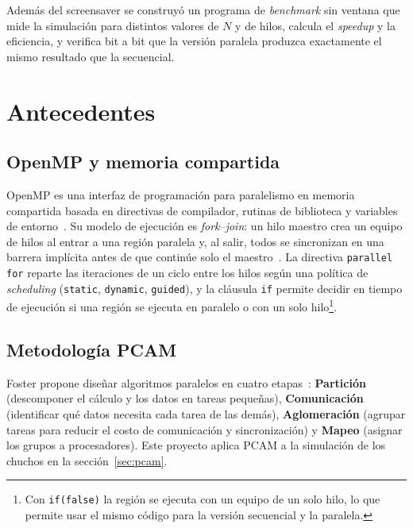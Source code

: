 \documentclass[11pt,letterpaper]{article}
\newcommand{\codigo}[1]{\texttt{#1}}
\begin{document}
Además del screensaver se construyó un programa de \emph{benchmark} sin ventana
que mide la simulación para distintos valores de $N$ y de hilos, calcula el
\emph{speedup} y la eficiencia, y verifica bit a bit que la versión paralela
produzca exactamente el mismo resultado que la secuencial.

\section{Antecedentes}

\subsection{OpenMP y memoria compartida}

OpenMP es una interfaz de programación para paralelismo en memoria compartida
basada en directivas de compilador, rutinas de biblioteca y variables de
entorno~\cite{openmp52}. Su modelo de ejecución es \emph{fork--join}: un hilo
maestro crea un equipo de hilos al entrar a una región paralela y, al salir,
todos se sincronizan en una barrera implícita antes de que continúe solo el
maestro~\cite{chapman2008}. La directiva \codigo{parallel for} reparte las
iteraciones de un ciclo entre los hilos según una política de
\emph{scheduling} (\codigo{static}, \codigo{dynamic}, \codigo{guided}), y la
cláusula \codigo{if} permite decidir en tiempo de ejecución si una región se
ejecuta en paralelo o con un solo hilo\footnote{Con \codigo{if(false)} la
región se ejecuta con un equipo de un solo hilo, lo que permite usar el mismo
código para la versión secuencial y la paralela.}.

\subsection{Metodología PCAM}

Foster propone diseñar algoritmos paralelos en cuatro etapas~\cite{foster1995}:
\textbf{Partición} (descomponer el cálculo y los datos en tareas pequeñas),
\textbf{Comunicación} (identificar qué datos necesita cada tarea de las demás),
\textbf{Aglomeración} (agrupar tareas para reducir el costo de comunicación y
sincronización) y \textbf{Mapeo} (asignar los grupos a procesadores). Este
proyecto aplica PCAM a la simulación de los chuchos en la
sección~\ref{sec:pcam}.
\end{document}
